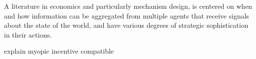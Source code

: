 A literature in economics and particularly mechanism design, is centered on when and how information can be aggregated from multiple agents that receive signals about the state of the world, and have various degrees of strategic sophistication in their actions.

explain myopic incentive compatible




